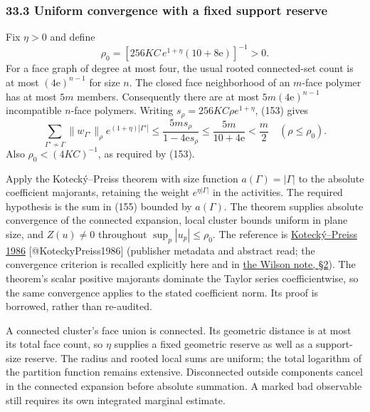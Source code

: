 \documentclass[11pt,a4paper]{article}
\begin{document}
\hypertarget{uniform-convergence-with-a-fixed-support-reserve}{%
\subsubsection{33.3 Uniform convergence with a fixed support
reserve}\label{uniform-convergence-with-a-fixed-support-reserve}}

Fix \(\eta>0\) and define \[\rho_0=
 [256KC\,e^{1+\eta}(10+8\mathrm e)]^{-1}>0.\tag{154}\] For a face graph
of degree at most four, the usual rooted connected-set count is at most
\((4\mathrm e)^{n-1}\) for size \(n\). The closed face neighborhood of
an \(m\)-face polymer has at most \(5m\) members. Consequently there are
at most \(5m(4\mathrm e)^{n-1}\) incompatible \(n\)-face polymers.
Writing \(s_\rho=256KC\rho e^{1+\eta}\), (153) gives
\[\sum_{\Gamma'\not\sim\Gamma}
 \|w_{\Gamma'}\|_\rho e^{(1+\eta)|\Gamma'|}
\le\frac{5m s_\rho}{1-4\mathrm e s_\rho}
\le\frac{5m}{10+4\mathrm e}<\frac m2
\quad(\rho\le\rho_0).\tag{155}\] Also \(\rho_0<(4KC)^{-1}\), as required
by (153).

Apply the Kotecký--Preiss theorem with size function
\(a(\Gamma)=|\Gamma|\) to the absolute coefficient majorants, retaining
the weight \(e^{\eta|\Gamma|}\) in the activities. The required
hypothesis is the sum in (155) bounded by \(a(\Gamma)\). The theorem
supplies absolute convergence of the connected expansion, local cluster
bounds uniform in plane size, and \(Z(u)\ne0\) throughout
\(\sup_p|u_p|\le\rho_0\). The reference is
\href{https://doi.org/10.1007/BF01211762}{Kotecký--Preiss 1986}
{[}@KoteckyPreiss1986{]} (publisher metadata and abstract read; the
convergence criterion is recalled explicitly here and in
\href{wilson-strong-coupling-explicit.md\#2-convergence-the-kotecky--preiss-criterion-with-numbers}{the
Wilson note, §2}). The theorem's scalar positive majorants dominate the
Taylor series coefficientwise, so the same convergence applies to the
stated coefficient norm. Its proof is borrowed, rather than re-audited.

A connected cluster's face union is connected. Its geometric distance is
at most its total face count, so \(\eta\) supplies a fixed geometric
reserve as well as a support-size reserve. The radius and rooted local
sums are uniform; the total logarithm of the partition function remains
extensive. Disconnected outside components cancel in the connected
expansion before absolute summation. A marked bad observable still
requires its own integrated marginal estimate.
\end{document}
